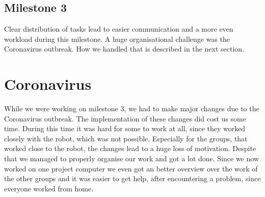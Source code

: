 \documentclass[main.tex]{subfiles}
\begin{document}
		\subsection{Milestone 3}
		Clear distribution of tasks lead to easier communication and a more even workload during this milestone.
		A huge organisational challenge was the Coronavirus outbreak. How we handled that is described in the next section. 
		
		\section{Coronavirus}
	  	While we were working on milestone 3, we had to make major changes due to the Coronavirus outbreak. The implementation of these changes did cost us some time. During this time it was hard for some to work at all, since they worked closely with the robot, which was not possible.
	  	Especially for the groups, that worked close to the robot, the changes lead to a huge loss of motivation.
	  	Despite that we managed to properly organise our work and got a lot done.
	  	Since we now worked on one project computer we even got an better overview over the work of the other groups and it was easier to get help, after encountering a problem, since everyone worked from home.

	\endgroup
\end{document}
